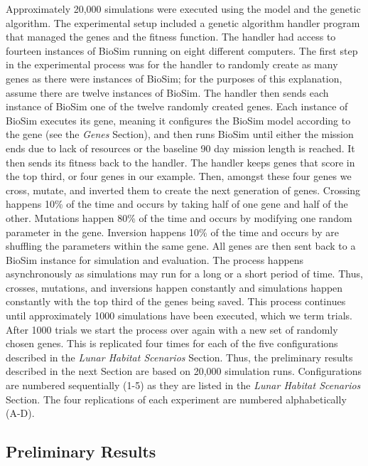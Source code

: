 \documentclass[submit]{aiaa}
\begin{document}
Approximately 20,000 simulations were executed using the model and the genetic algorithm.  
The experimental setup included a genetic
algorithm handler program that managed the genes and the fitness
function.  The handler had access to fourteen instances of BioSim
running on eight different computers.  
The first step in the experimental process was for the handler to randomly create as many genes as there were instances of BioSim; for the purposes of this explanation, assume there are twelve instances of BioSim.  
The handler then sends each instance of BioSim one of the twelve randomly created genes.  
Each instance of BioSim executes its gene, meaning it configures the BioSim model according to the gene (see the \emph{Genes} Section),%
and then runs BioSim until either the mission ends due to lack of resources or the baseline 90 day mission length is reached.
It then sends its fitness back to the handler.  
The handler keeps genes that score in the top third, or four genes in our example.  
Then, amongst these four genes we cross, mutate, and  inverted them to create the next generation of genes.
Crossing happens 10\% of the time and occurs by taking half of one gene and half of the other.  
Mutations happen 80\% of the time and occurs by modifying one random parameter in the gene.  
Inversion happens 10\% of the time and occurs by are shuffling the parameters within the same gene.  
All genes are then sent back to a BioSim instance for
simulation and evaluation.  The process happens asynchronously as
simulations may run for a long or a short period of time.  
Thus, crosses, mutations, and inversions happen constantly and simulations happen constantly with the top third of the genes being saved.  
This process continues until approximately 1000 simulations have been executed, which we term trials.  
After 1000 trials we start the process over again with a new set of randomly chosen genes.  
This is replicated four times for each of the five configurations described in
the \emph{Lunar Habitat Scenarios} Section.%
Thus, the preliminary results described
in the next Section are based on 20,000 simulation
runs. Configurations are numbered sequentially (1-5) as they are
listed in the \emph{Lunar Habitat Scenarios} Section.%
The four replications of each
experiment are numbered alphabetically (A-D).

\subsection{Preliminary Results}
\end{document}
